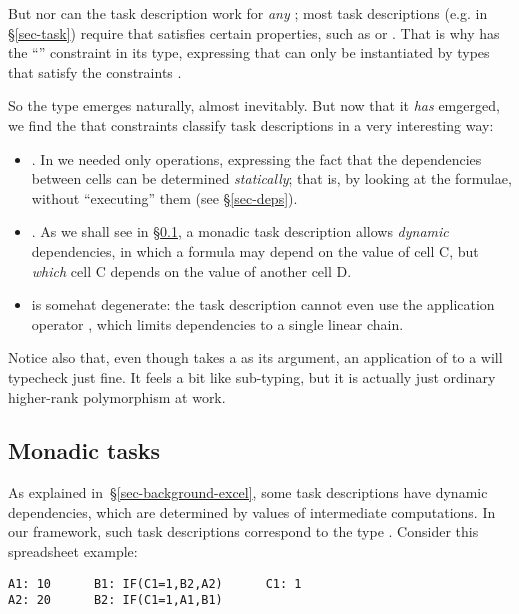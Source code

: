 But nor can the task description work for \emph{any} ; most
task descriptions (e.g.  in \S\ref{sec-task}) require that
 satisfies certain properties, such as  or
.  That is why  has the ``''
constraint in its type, expressing that  can only be instantiated by types
that satisfy the constraints .

So the type  emerges naturally, almost inevitably.  But now that
it \emph{has} emgerged, we find the that constraints  classify task descriptions
in a very interesting way:
\begin{itemize}
\item {}. In  we needed only  operations,
  expressing the fact that the dependencies between cells can be determined \emph{statically};
  that is, by looking at the formulae, without ``executing'' them (see \S\ref{sec-deps}).
\item {}.  As we shall see in \S\ref{sec-task-monad}, a monadic task
  description allows \emph{dynamic} dependencies, in which a formula
  may depend on the value of cell C, but \emph{which} cell C depends on
  the value of another cell D.
\item {} is somehat degenerate: the task description cannot even use
  the application operator \hs{<*>}, which limits dependencies to a single linear chain.
\end{itemize}

Notice also that, even though  takes a  as its argument, an application of
 to a  will typecheck just fine.  It feels a bit
like sub-typing, but it is actually just ordinary higher-rank polymorphism at work.

\subsection{Monadic tasks}\label{sec-task-monad}

As explained in~\S\ref{sec-background-excel}, some task descriptions have dynamic
dependencies, which are determined by values of intermediate computations. In
our framework, such task descriptions correspond to the type
. Consider this spreadsheet
example:

\vspace{1mm}
\begin{verbatim}
A1: 10      B1: IF(C1=1,B2,A2)      C1: 1
A2: 20      B2: IF(C1=1,A1,B1)
\end{verbatim}

